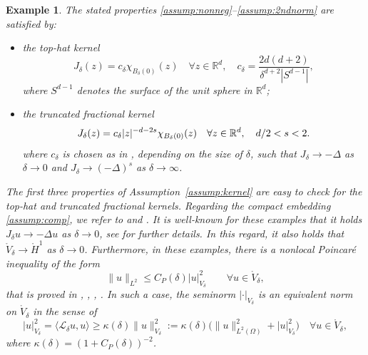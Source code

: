 \documentclass[]{article}
\newtheorem{example}{Example}
\DeclarePairedDelimiter{\abs}{\lvert}{\rvert}
\begin{document}
\begin{example} \label{Ex:Kernels}
	The stated properties \eqref{assump:nonneg}--\eqref{assump:2ndnorm} are satisfied by: 
	\begin{itemize}
		\item the top-hat kernel  \begin{equation} \label{Eq:NormalizationJdelta}
			J_\delta(z) = c_\delta \chi_{B_\delta(0)}(z) \quad \forall z \in \mathbb{R}^d, \quad
			c_\delta= \frac{2d(d+2)}{\delta^{d+2} |S^{d-1}|},
		\end{equation}
		where \(S^{d-1}\) denotes the surface of the unit sphere in \(\mathbb{R}^d\);
		\item the truncated fractional kernel \cite[Eq.~(2.7)]{du2023nonlocal}
		\[    J_\delta(z)=c_\delta\abs{z}^{-d-2s}\chi_{B_\delta(0)}(z) \quad \forall z \in \mathbb{R}^d, \quad d/2 < s < 2.
		\]
		where $c_\delta$ is chosen as in \cite[Eq.~(2.20)--(2.22)]{du2023nonlocal}, depending on the size of $\delta$, such that $J_\delta \to -\Delta$ as $\delta \to 0$ and $J_\delta \to (-\Delta)^s$ as $\delta \to \infty$.
	\end{itemize}
	The first three properties of Assumption~\ref{assump:kernel} are easy to check for the top-hat and truncated fractional kernels. Regarding the compact embedding \eqref{assump:comp}, we refer to \cite[Thm.~1.9]{scott2024nonlocal} and \cite[Cor~3.12]{du2019nonlocal}.   It is well-known for these examples that it holds $J_\delta u \to -\Delta u$ as $\delta \to 0$, see \cite{du2019nonlocal,du2012analysis} for further details. In this regard, it also holds that $\mathring{V}_\delta \to \mathring{H}^1$ as $\delta \to 0$. Furthermore, in these examples, there is a nonlocal Poincaré inequality of the form $$\|u\|_{L^2} \leq C_P(\delta) |u|_{V_\delta}^2 \qquad \forall u \in \mathring{V}_\delta,$$ 
	that is proved in \cite[Prop.~4.1]{du2012analysis}, \cite[Lem.~3.7]{gunzburger2010nlvc}, \cite[Lem.~3.2]{du2023nonlocal}, \cite[Prop.~3.22]{du2019nonlocal}. In such a case, the seminorm $|\cdot|_{V_\delta}$ is an equivalent norm on $\mathring{V}_\delta$ in the sense of
	\begin{equation*} 
		|u|_{V_\delta}^2 = \langle \mathcal{L}_\delta u,u \rangle \geq \kappa(\delta) \|u\|_{V_\delta}^{2}:=\kappa(\delta) \big( \|u\|_{L^{2}(\Omega)}^{2}+|u|_{{V_\delta}}^{2} \bigr) \quad \forall u \in \mathring{V}_\delta,
	\end{equation*}
	where $\kappa(\delta)=(1+C_P(\delta))^{-2}$.
\end{example}
\ \\
\end{document}
